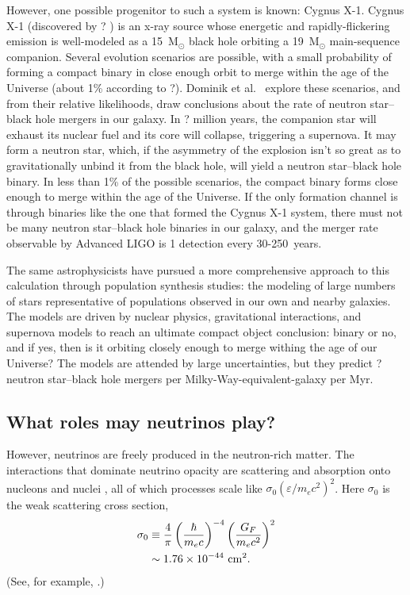 However, one possible progenitor to such a system is known: Cygnus X-1.
Cygnus X-1 (discovered by ?
)
is an x-ray source whose energetic and rapidly-flickering emission
is well-modeled as a 15~M$_\odot$ black hole orbiting a 19~M$_\odot$
main-sequence companion.
Several evolution scenarios are possible, with a small probability of forming
a compact binary in close enough orbit to merge within the age of the Universe
(about 1\% according to ?).
Dominik et al.\
explore these scenarios, and from their relative likelihoods, draw conclusions
about the rate of neutron star--black hole mergers in our galaxy.
In ? million years,
the companion star will exhaust its nuclear fuel and its core will collapse,
triggering a supernova. It may form a neutron star, which, if the asymmetry of
the explosion isn't so great as to gravitationally unbind it from the black hole,
will yield a neutron star--black hole binary. In less than 1\% of the possible
scenarios, the compact binary forms close enough to merge within the age of the
Universe. If the only formation channel is through
binaries like the one that formed the Cygnus X-1 system, there must not be many
neutron star--black hole binaries in our galaxy, and the merger rate observable
by Advanced LIGO is 1 detection every 30-250~years.

The same astrophysicists have pursued a more comprehensive approach to this
calculation through population synthesis studies: the modeling of large numbers
of stars representative of populations observed in our own and nearby galaxies.
The models are driven by nuclear physics, gravitational interactions, and
supernova models to reach an ultimate compact object conclusion: binary or no,
and if yes, then is it orbiting closely enough to merge withing the age of
our Universe? The models are attended by large uncertainties, but they
predict ? neutron star--black hole mergers per Milky-Way-equivalent-galaxy
per Myr.

\subsection{What roles may neutrinos play?}


However, neutrinos are freely produced in the neutron-rich matter. The
interactions that dominate neutrino opacity are scattering and absorption onto
nucleons and nuclei \citep[Sec.\ 11.7]{shap1983-bh_wd_ns}, all of which processes
scale like $\sigma_0(\varepsilon/m_e c^2)^2$. Here $\sigma_0$ is the weak
scattering cross section,
\begin{align}
  \sigma_0
  &\equiv \frac{4}{\pi}\left(\frac{\hbar}{m_e c}\right)^{-4}
  \left(\frac{G_F}{m_e c^2}\right)^2 \\
  &\sim   1.76 \times 10^{-44} \,\, {\rm cm}^2.
\end{align}
(See, for example, \citealt{tubb1975-neutrino_opacities}.)

